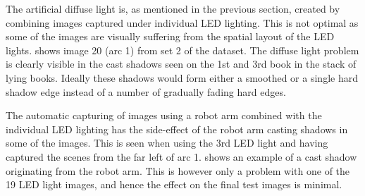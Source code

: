 \documentclass[thesis.tex]{subfiles}
\begin{document}
The artificial diffuse light is, as mentioned in the previous section, created by combining images captured under individual LED lighting. This is not optimal as some of the images are visually suffering from the spatial layout of the LED lights.  shows image 20 (arc 1) from set 2 of the dataset. The diffuse light problem is clearly visible in the cast shadows seen on the 1st and 3rd book in the stack of lying books. Ideally these shadows would form either a smoothed or a single hard shadow edge instead of a number of gradually fading hard edges.

The automatic capturing of images using a robot arm combined with the individual LED lighting has the side-effect of the robot arm casting shadows in some of the images. This is seen when using the 3rd LED light and having captured the scenes from the far left of arc 1.  shows an example of a cast shadow originating from the robot arm. This is however only a problem with one of the 19 LED light images, and hence the effect on the final test images is minimal.
%
\end{document}
